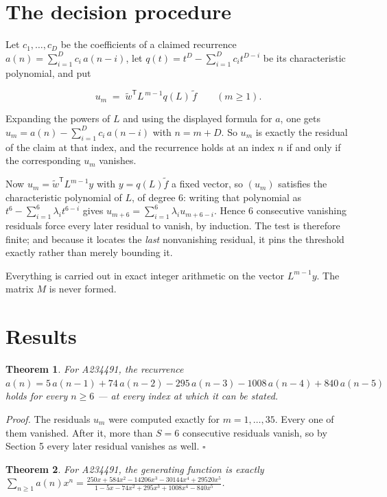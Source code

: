 \documentclass[11pt]{article}
\newtheorem{theorem}{Theorem}
\theoremstyle{definition}
\begin{document}
\section{The decision procedure}

Let $c_1,\dots,c_D$ be the coefficients of a claimed recurrence $a(n) = \sum_{i=1}^{D} c_i\,a(n-i)$, let $q(t) = t^{D} - \sum_{i=1}^{D} c_i t^{D-i}$ be its characteristic polynomial, and put

\[u_m \;=\; \tilde w^{\mathsf T} L^{\,m-1} q(L)\,\tilde f \qquad (m \ge 1).\]

Expanding the powers of $L$ and using the displayed formula for $a$, one gets $u_m = a(n) - \sum_{i=1}^{D} c_i\,a(n-i)$ with $n = m + D$. So $u_m$ is exactly the residual of the claim at that index, and the recurrence holds at an index $n$ if and only if the corresponding $u_m$ vanishes.

Now $u_m = \tilde w^{\mathsf T} L^{m-1} y$ with $y = q(L)\tilde f$ a fixed vector, so $(u_m)$ satisfies the characteristic polynomial of $L$, of degree $6$: writing that polynomial as $t^{6} - \sum_{i=1}^{6} \lambda_i t^{6-i}$ gives $u_{m+6} = \sum_{i=1}^{6} \lambda_i u_{m+6-i}$. Hence $6$ consecutive vanishing residuals force every later residual to vanish, by induction. The test is therefore finite; and because it locates the {\itshape last} nonvanishing residual, it pins the threshold exactly rather than merely bounding it.

Everything is carried out in exact integer arithmetic on the vector $L^{m-1}y$. The matrix $M$ is never formed.

\section{Results}

\begin{theorem} For A234491, the recurrence $a(n) = 5\,a(n-1) + 74\,a(n-2) - 295\,a(n-3) - 1008\,a(n-4) + 840\,a(n-5)$ holds for every $n \ge 6$ --- at every index at which it can be stated.\end{theorem}

{\itshape Proof.} The residuals $u_m$ were computed exactly for $m = 1,\dots,35$. Every one of them vanished. After it, more than $S = 6$ consecutive residuals vanish, so by Section 5 every later residual vanishes as well. $\square$

\begin{theorem} For A234491, the generating function is exactly $\sum_{n\ge 1} a(n)x^n = \frac{250x + 584x^{2} - 14206x^{3} - 30144x^{4} + 29520x^{5}}{1 - 5x - 74x^{2} + 295x^{3} + 1008x^{4} - 840x^{5}}$.\end{theorem}
\end{document}
